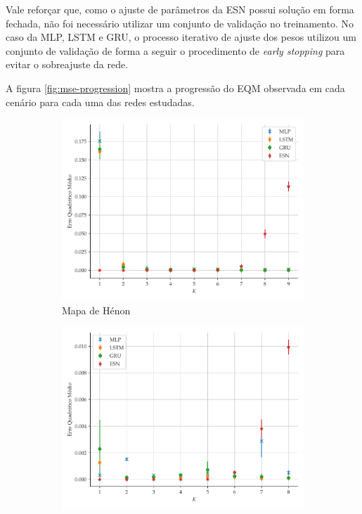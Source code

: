 \documentclass[a4paper, 12pt]{article}
\begin{document}
Vale reforçar que, como o ajuste de parâmetros da ESN possui solução em forma fechada, não foi necessário utilizar um conjunto de validação no treinamento. No caso da MLP, LSTM e GRU, o processo iterativo de ajuste dos pesos utilizou um conjunto de validação de forma a seguir o procedimento de \textit{early stopping} para evitar o sobreajuste da rede.

A figura \ref{fig:mse-progression} mostra a progressão do EQM observada em cada cenário para cada uma das redes estudadas. 
\begin{figure}[!ht]
     \begin{subfigure}[t]{0.4\textwidth} 
         \includegraphics[scale=0.4]{progressao-k-henon.pdf}
         \caption{Mapa de Hénon}
     \end{subfigure}
     \centering
     \begin{subfigure}[t]{0.4\textwidth} 
         \includegraphics[scale=0.4]{progressao-k-logistic.pdf}

\end{subfigure}
\end{figure}
\end{document}
